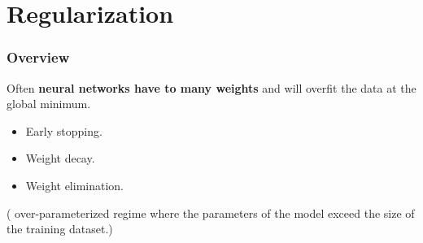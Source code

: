 \section{Regularization}

\begin{frame}
    \frametitle{Overview}
    Often \textbf{neural networks have to many weights} and will overfit the data at 
    the global minimum.
    
    \begin{itemize}
        \item Early stopping.
        \item Weight decay. 
        \item Weight elimination.
    \end{itemize}
    \cite{AUniversalLawofRobustness} ( over-parameterized regime where the parameters of the model exceed the size of the training dataset.)
\end{frame}

